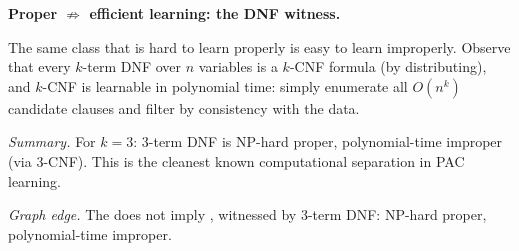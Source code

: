 \begin{separation}
\textbf{Proper $\not\Rightarrow$ efficient learning: the DNF witness.}

\medskip\noindent
The same class that is hard to learn properly is easy to learn improperly.
Observe that every $k$-term DNF over $n$ variables is a $k$-CNF formula
(by distributing), and $k$-CNF is learnable in polynomial time: simply
enumerate all $O(n^k)$ candidate clauses and filter by consistency with the
data.

\medskip\noindent
\emph{Summary.} For $k = 3$: 3-term DNF is NP-hard proper, polynomial-time
improper (via 3-CNF).  This is the cleanest known computational separation
in PAC learning.

\medskip\noindent
\emph{Graph edge.}  The  does not imply
, witnessed by $3$-term DNF: NP-hard proper, polynomial-time
improper.
\end{separation}


